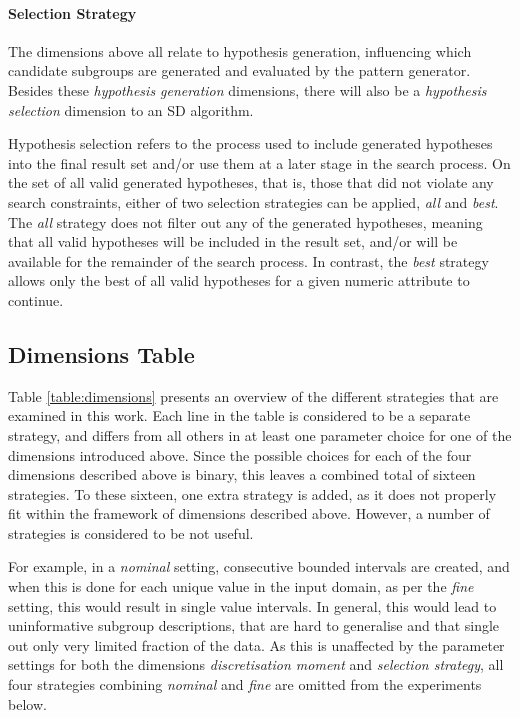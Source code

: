 \documentclass[smallextended]{svjour3}
\newcommand{\dimension}{\emph}
\newcommand{\parameter}{\emph}
\newcommand{\nominal}{\parameter{nominal}}
\newcommand{\fine}{\parameter{fine}}
\newcommand{\all}{\parameter{all}}
\newcommand{\best}{\parameter{best}}
\newcommand{\sd}{SD}
\begin{document}
\paragraph{Selection Strategy}
The dimensions above all relate to hypothesis generation, influencing which candidate subgroups are generated and evaluated by the pattern generator.
Besides these \emph{hypothesis generation} dimensions, there will also be a \emph{hypothesis selection} dimension to an \sd{} algorithm.

Hypothesis selection refers to the process used to include generated hypotheses into the final result set and/or use them at a later stage in the search process.
On the set of all valid generated hypotheses, that is, those that did not violate any search constraints, either of two selection strategies can be applied, \all{} and \best{}.
The \all{} strategy does not filter out any of the generated hypotheses, meaning that all valid hypotheses will be included in the result set, and/or will be available for the remainder of the search process.
In contrast, the \best{} strategy allows only the best of all valid hypotheses for a given numeric attribute to continue.





\subsection{Dimensions Table}
\label{section:dimensions-table}

Table \ref{table:dimensions} presents an overview of the different strategies that are examined in this work.
Each line in the table is considered to be a separate strategy, and differs from all others in at least one parameter choice for one of the dimensions introduced above.
Since the possible choices for each of the four dimensions described above is binary, this leaves a combined total of sixteen strategies.
To these sixteen, one extra strategy is added, as it does not properly fit within the framework of dimensions described above.
However, a number of strategies is considered to be not useful.

For example, in a \nominal{} setting, consecutive bounded intervals are created, and when this is done for each unique value in the input domain, as per the \fine{} setting, this would result in single value intervals.
In general, this would lead to uninformative subgroup descriptions, that are hard to generalise and that single out only very limited fraction of the data.
As this is unaffected by the parameter settings for both the dimensions \dimension{discretisation moment} and \dimension{selection strategy}, all four strategies combining \nominal{} and \fine{} are omitted from the experiments below.
\end{document}
